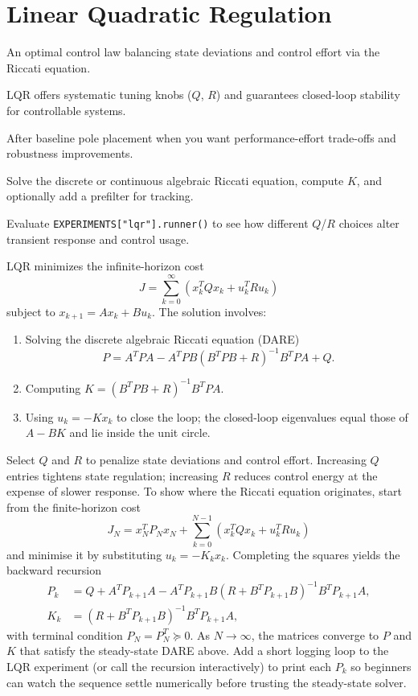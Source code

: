 \section{Linear Quadratic Regulation}
\begin{beginnerguide}
    \item[\textbf{What?}] An optimal control law balancing state deviations and control effort via the Riccati equation.
    \item[\textbf{Why?}] LQR offers systematic tuning knobs ($Q$, $R$) and guarantees closed-loop stability for controllable systems.
    \item[\textbf{When?}] After baseline pole placement when you want performance-effort trade-offs and robustness improvements.
    \item[\textbf{How?}] Solve the discrete or continuous algebraic Riccati equation, compute $K$, and optionally add a prefilter for tracking.
    \item[\textbf{Example}] Evaluate \texttt{EXPERIMENTS["lqr"].runner()} to see how different $Q$/$R$ choices alter transient response and control usage.
\end{beginnerguide}
LQR minimizes the infinite-horizon cost
\begin{equation}
    J = \sum_{k=0}^{\infty} (x_k^T Q x_k + u_k^T R u_k)
\end{equation}
subject to $x_{k+1} = A x_k + B u_k$. The solution involves:
\begin{enumerate}[leftmargin=*]
    \item Solving the discrete algebraic Riccati equation (DARE)
    \begin{equation}
        P = A^T P A - A^T P B (B^T P B + R)^{-1} B^T P A + Q.
    \end{equation}
    \item Computing $K = (B^T P B + R)^{-1} B^T P A$.
    \item Using $u_k = -K x_k$ to close the loop; the closed-loop eigenvalues equal those of $A - B K$ and lie inside the unit circle.
\end{enumerate}
Select $Q$ and $R$ to penalize state deviations and control effort. Increasing $Q$ entries tightens state regulation; increasing $R$ reduces control energy at the expense of slower response. To show where the Riccati equation originates, start from the finite-horizon cost
\[
J_N = x_N^T P_N x_N + \sum_{k=0}^{N-1} (x_k^T Q x_k + u_k^T R u_k)
\]
and minimise it by substituting $u_k = -K_k x_k$. Completing the squares yields the backward recursion
\begin{align*}
    P_k &= Q + A^T P_{k+1} A - A^T P_{k+1} B (R + B^T P_{k+1} B)^{-1} B^T P_{k+1} A,\\
    K_k &= (R + B^T P_{k+1} B)^{-1} B^T P_{k+1} A,
\end{align*}
with terminal condition $P_N = P_N^T \succeq 0$. As $N \to \infty$, the matrices converge to $P$ and $K$ that satisfy the steady-state DARE above. Add a short logging loop to the LQR experiment (or call the recursion interactively) to print each $P_k$ so beginners can watch the sequence settle numerically before trusting the steady-state solver.

